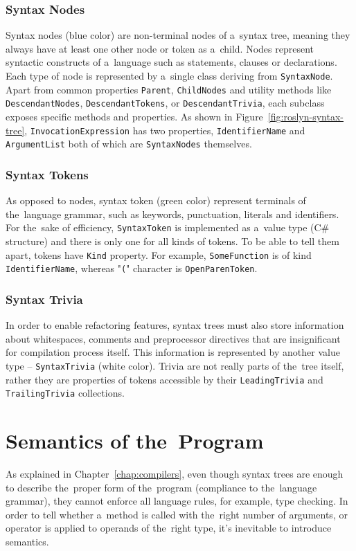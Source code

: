 \documentclass[
  digital, %
  table,   %
  lof,     %
  lot,     %
  oneside,
]{fithesis3}
\begin{document}
\subsubsection{\textbf{Syntax Nodes}}
Syntax nodes (blue color) are non-terminal nodes of a~syntax tree, meaning they always have at least one other node or token as a~child. Nodes represent syntactic constructs of a~language such as statements, clauses or declarations. Each type of node is represented by a~single class deriving from \texttt{SyntaxNode}. Apart from common properties \texttt{Parent}, \texttt{ChildNodes} and utility methods like \texttt{DescendantNodes}, \texttt{DescendantTokens}, or \texttt{DescendantTrivia}, each subclass exposes specific methods and properties. As shown in Figure~\ref{fig:roslyn-syntax-tree}, \texttt{InvocationExpression} has two properties, \texttt{IdentifierName} and \texttt{ArgumentList} both of which are \texttt{SyntaxNodes} themselves.
 
\subsubsection{\textbf{Syntax Tokens}}
As opposed to nodes, syntax token (green color) represent terminals of the~language grammar, such as keywords, punctuation, literals and identifiers. For the~sake of efficiency, \texttt{SyntaxToken} is implemented as a~value type (C\# structure) and there is only one for all kinds of tokens. To be able to tell them apart, tokens have \texttt{Kind} property. For example, \texttt{SomeFunction} is of kind \texttt{IdentifierName}, whereas "\texttt{(}" character is \texttt{OpenParenToken}.

\subsubsection{\textbf{Syntax Trivia}}
In order to enable refactoring features, syntax trees must also store information about whitespaces, comments and preprocessor directives that are insignificant for compilation process itself. This information is represented by another value type -- \texttt{SyntaxTrivia} (white color). Trivia are not really parts of the~tree itself, rather they are properties of tokens accessible by their \texttt{LeadingTrivia} and \texttt{TrailingTrivia} collections.

\section{Semantics of the~Program}
As explained in Chapter~\ref{chap:compilers}, even though syntax trees are enough to describe the~proper form of the~program (compliance to the~language grammar), they cannot enforce all language rules, for example, type checking. In order to tell whether a~method is called with the~right number of arguments, or operator is applied to operands of the~right type, it's inevitable to introduce semantics. 
\end{document}
